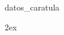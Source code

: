 \documentclass[12pt, a4paper]{article}
\begin{document}
	\let\footnote=\endnote

     {datos_caratula}

    \small
    \newpage \printindex
    \normalsize
    
	

    \newpage	
    \begingroup
        \parindent 0pt
        \parskip 2ex
        \def\enotesize{\normalsize}
    \endgroup
\end{document}
